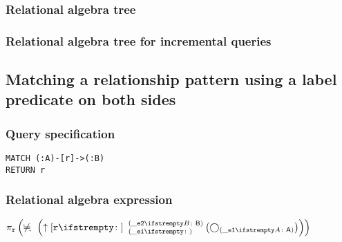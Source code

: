 \subsubsection*{Relational algebra tree}


\subsubsection*{Relational algebra tree for incremental queries}


\subsection{Matching a relationship pattern using a label predicate on both sides}

\subsubsection*{Query specification}

\begin{lstlisting}
MATCH (:A)-[r]->(:B)
RETURN r
\end{lstlisting}

\subsubsection*{Relational algebra expression}

$\projection{\var{r}} \left(\alldifferent{} \left(\expandout{r}{}{\_e1}{\_e2}{B} \left(\getvertices{\_e1}{A}\right)\right)\right)$

